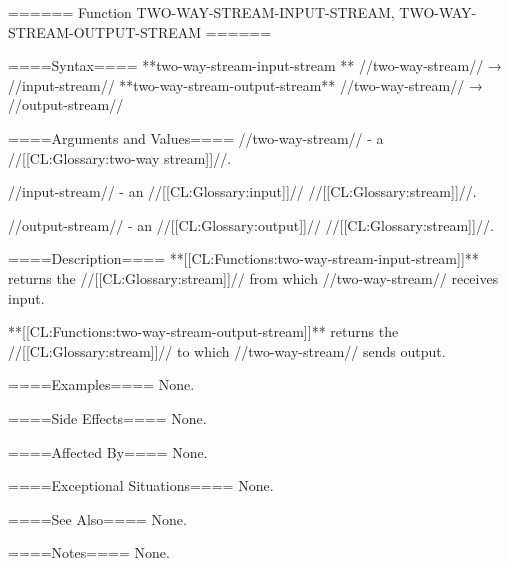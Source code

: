 ====== Function TWO-WAY-STREAM-INPUT-STREAM, TWO-WAY-STREAM-OUTPUT-STREAM ======

====Syntax====
**two-way-stream-input-stream ** //two-way-stream// → //input-stream// **two-way-stream-output-stream** //two-way-stream// → //output-stream//

====Arguments and Values====
//two-way-stream// - a //[[CL:Glossary:two-way stream]]//.

//input-stream// - an //[[CL:Glossary:input]]// //[[CL:Glossary:stream]]//.

//output-stream// - an //[[CL:Glossary:output]]// //[[CL:Glossary:stream]]//.

====Description====
**[[CL:Functions:two-way-stream-input-stream]]** returns the //[[CL:Glossary:stream]]// from which //two-way-stream// receives input.

**[[CL:Functions:two-way-stream-output-stream]]** returns the //[[CL:Glossary:stream]]// to which //two-way-stream// sends output.

====Examples====
None.

====Side Effects====
None.

====Affected By====
None.

====Exceptional Situations====
None.

====See Also====
None.

====Notes====
None.

